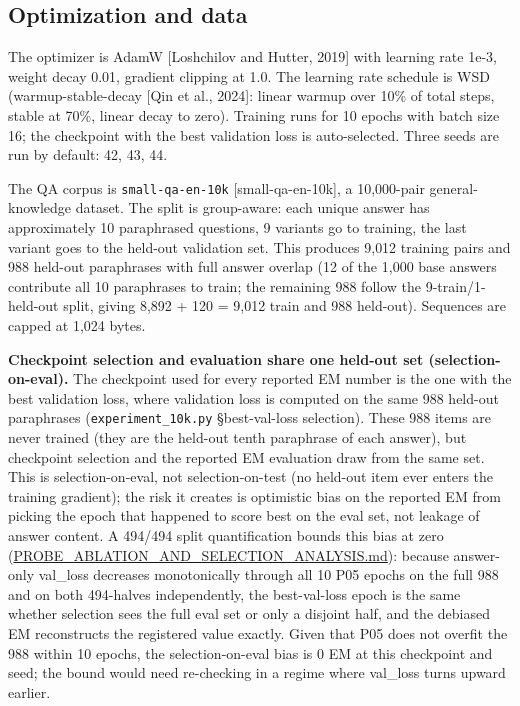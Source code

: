 \documentclass[11pt]{article}
\begin{document}
\subsection{Optimization and data}

The optimizer is AdamW [Loshchilov and Hutter, 2019] with learning rate 1e-3, weight decay 0.01, gradient clipping at 1.0. The learning rate schedule is WSD (warmup-stable-decay [Qin et al., 2024]: linear warmup over 10\% of total steps, stable at 70\%, linear decay to zero). Training runs for 10 epochs with batch size 16; the checkpoint with the best validation loss is auto-selected. Three seeds are run by default: 42, 43, 44.

The QA corpus is \texttt{small-qa-en-10k} [small-qa-en-10k], a 10{,}000-pair general-knowledge dataset. The split is group-aware: each unique answer has approximately 10 paraphrased questions, 9 variants go to training, the last variant goes to the held-out validation set. This produces 9{,}012 training pairs and 988 held-out paraphrases with full answer overlap (12 of the 1{,}000 base answers contribute all 10 paraphrases to train; the remaining 988 follow the 9-train/1-held-out split, giving 8{,}892 + 120 = 9{,}012 train and 988 held-out). Sequences are capped at 1{,}024 bytes.

\textbf{Checkpoint selection and evaluation share one held-out set (selection-on-eval).} The checkpoint used for every reported EM number is the one with the best validation loss, where validation loss is computed on the same 988 held-out paraphrases (\texttt{experiment\_10k.py} \S best-val-loss selection). These 988 items are never trained (they are the held-out tenth paraphrase of each answer), but checkpoint selection and the reported EM evaluation draw from the same set. This is selection-on-eval, not selection-on-test (no held-out item ever enters the training gradient); the risk it creates is optimistic bias on the reported EM from picking the epoch that happened to score best on the eval set, not leakage of answer content. A 494/494 split quantification bounds this bias at zero (\href{https://github.com/llaa33219/MicroMixer-4/blob/4bb630413dfa58ef3141291e121ab8c006d03235/PROBE_ABLATION_AND_SELECTION_ANALYSIS.md}{PROBE\_ABLATION\_AND\_SELECTION\_ANALYSIS.md}): because answer-only val\_loss decreases monotonically through all 10 P05 epochs on the full 988 and on both 494-halves independently, the best-val-loss epoch is the same whether selection sees the full eval set or only a disjoint half, and the debiased EM reconstructs the registered value exactly. Given that P05 does not overfit the 988 within 10 epochs, the selection-on-eval bias is 0 EM at this checkpoint and seed; the bound would need re-checking in a regime where val\_loss turns upward earlier.
\end{document}
